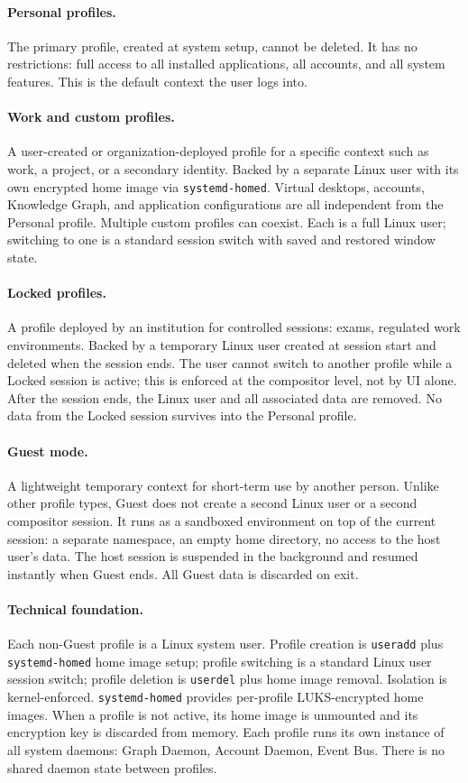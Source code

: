 \paragraph{Personal profiles.}
The primary profile, created at system setup, cannot be deleted. It has no
restrictions: full access to all installed applications, all accounts, and all
system features. This is the default context the user logs into.

\paragraph{Work and custom profiles.}
A user-created or organization-deployed profile for a specific context such as
work, a project, or a secondary identity. Backed by a separate Linux user with
its own encrypted home image via \texttt{systemd-homed}. Virtual desktops,
accounts, Knowledge Graph, and application configurations are all independent
from the Personal profile. Multiple custom profiles can coexist. Each is a
full Linux user; switching to one is a standard session switch with saved and
restored window state.

\paragraph{Locked profiles.}
A profile deployed by an institution for controlled sessions: exams, regulated
work environments. Backed by a temporary Linux user created at session start
and deleted when the session ends. The user cannot switch to another profile
while a Locked session is active; this is enforced at the compositor level, not
by UI alone. After the session ends, the Linux user and all associated data are
removed. No data from the Locked session survives into the Personal profile.

\paragraph{Guest mode.}
A lightweight temporary context for short-term use by another person. Unlike
other profile types, Guest does not create a second Linux user or a second
compositor session. It runs as a sandboxed environment on top of the current
session: a separate namespace, an empty home directory, no access to the host
user's data. The host session is suspended in the background and resumed
instantly when Guest ends. All Guest data is discarded on exit.

\paragraph{Technical foundation.}
Each non-Guest profile is a Linux system user. Profile creation is
\texttt{useradd} plus \texttt{systemd-homed} home image setup; profile
switching is a standard Linux user session switch; profile deletion is
\texttt{userdel} plus home image removal. Isolation is kernel-enforced.
\texttt{systemd-homed} provides per-profile LUKS-encrypted home images. When
a profile is not active, its home image is unmounted and its encryption key
is discarded from memory. Each profile runs its own instance of all system
daemons: Graph Daemon, Account Daemon, Event Bus. There is no shared daemon
state between profiles.

